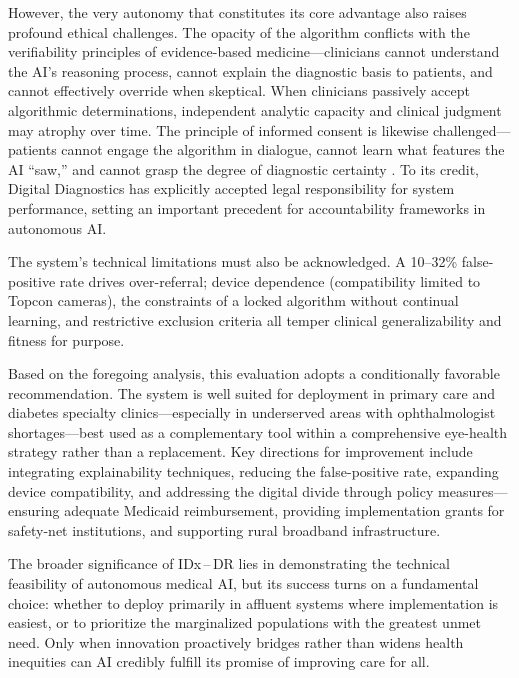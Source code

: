 \documentclass[sigconf]{acmart}
\begin{document}
However, the very autonomy that constitutes its core advantage also raises profound ethical challenges. The opacity of the algorithm conflicts with the verifiability principles of evidence\mbox{-}based medicine—clinicians cannot understand the AI’s reasoning process, cannot explain the diagnostic basis to patients, and cannot effectively override when skeptical. When clinicians passively accept algorithmic determinations, independent analytic capacity and clinical judgment may atrophy over time. The principle of informed consent is likewise challenged—patients cannot engage the algorithm in dialogue, cannot learn what features the AI “saw,” and cannot grasp the degree of diagnostic certainty \citep{Ursin2021InformedConsent}. To its credit, Digital Diagnostics has explicitly accepted legal responsibility for system performance, setting an important precedent for accountability frameworks in autonomous AI.

The system’s technical limitations must also be acknowledged. A 10–32\% false\mbox{-}positive rate drives over\mbox{-}referral; device dependence (compatibility limited to Topcon cameras), the constraints of a locked algorithm without continual learning, and restrictive exclusion criteria all temper clinical generalizability and fitness for purpose.

Based on the foregoing analysis, this evaluation adopts a conditionally favorable recommendation. The system is well suited for deployment in primary care and diabetes specialty clinics—especially in underserved areas with ophthalmologist shortages—best used as a complementary tool within a comprehensive eye\mbox{-}health strategy rather than a replacement. Key directions for improvement include integrating explainability techniques, reducing the false\mbox{-}positive rate, expanding device compatibility, and addressing the digital divide through policy measures—ensuring adequate Medicaid reimbursement, providing implementation grants for safety\mbox{-}net institutions, and supporting rural broadband infrastructure.

The broader significance of IDx\textsuperscript{\textregistered}\,–\,DR lies in demonstrating the technical feasibility of autonomous medical AI, but its success turns on a fundamental choice: whether to deploy primarily in affluent systems where implementation is easiest, or to prioritize the marginalized populations with the greatest unmet need. Only when innovation proactively bridges rather than widens health inequities can AI credibly fulfill its promise of improving care for all.



\end{document}
